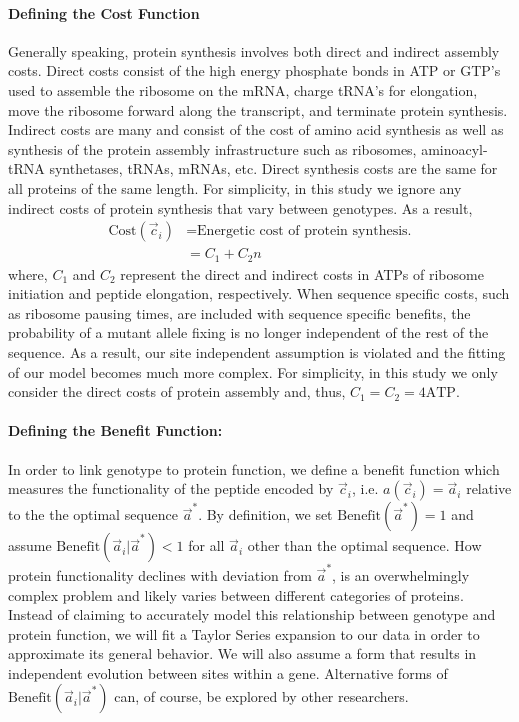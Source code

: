 \documentclass{article}
\newcommand{\cvec}{\ensuremath{\Vec{c}}\xspace}
\newcommand{\cveci}{\ensuremath{\cvec_i}\xspace}
\newcommand{\aveci}{\ensuremath{\Vec{a}_i}\xspace}
\newcommand{\aoptvec}{\ensuremath{\Vec{a}^*}\xspace}
\newcommand{\Costcveci}{\ensuremath{\text{Cost}(\cveci)}\xspace}
\newcommand{\Func}{\ensuremath{\text{Benefit}}\xspace}
\newcommand{\Funcaveci}{\ensuremath{\Func(\aveci|\aoptvec)}\xspace}
\newcommand{\Funcaoptvec}{\ensuremath{\Func(\aoptvec)}\xspace}
\begin{document}
\paragraph*{Defining the Cost Function}
Generally speaking, protein synthesis involves both direct and indirect assembly costs.
Direct costs consist of the high energy phosphate bonds in ATP or GTP's used to assemble the ribosome on the mRNA, charge tRNA's for elongation, move the ribosome forward along the transcript, and terminate protein synthesis.
Indirect costs are many and consist of the cost of amino acid synthesis as well as synthesis of the protein assembly infrastructure such as ribosomes, aminoacyl-tRNA synthetases, tRNAs, mRNAs, etc.
Direct synthesis costs are the same for all proteins of the same length.
For simplicity, in this study we ignore any indirect costs of protein synthesis that vary between genotypes.
As a result, 
\begin{align}
\label{eq:defineCost}
  \Costcveci  &= \text{Energetic cost of protein synthesis.}\\
  &= C_1 + C_2 n
\end{align}
where, $C_1$ and $C_2$ represent the direct and indirect costs in ATPs of ribosome initiation and peptide elongation, respectively.
When sequence specific costs, such as ribosome pausing times, are included with sequence specific benefits, the probability of a mutant allele fixing is no longer independent of the rest of the sequence.
As a result, our site independent assumption is violated and the fitting of our model becomes much more complex.
For simplicity, in this study we only consider the direct costs of protein assembly and, thus, $C_1 = C_2 = 4 \text{ATP}$.
 
\paragraph*{Defining the Benefit Function: }
In order to link genotype to protein function, we define a benefit function which measures the functionality of the peptide encoded by \cveci, i.e. $a(\cveci) = \aveci$ relative to the the optimal sequence $\aoptvec$.
By definition, we set $\Funcaoptvec = 1$ and assume $\Funcaveci < 1$ for all $\aveci$ other than the optimal sequence.
How protein functionality declines with deviation from \aoptvec, is an overwhelmingly complex problem and likely varies between different categories of proteins.
Instead of claiming to accurately model this relationship between genotype and protein function, we will fit a Taylor Series expansion to our data in order to approximate its general behavior.
We will also assume a form that results in independent evolution between sites within a gene.
Alternative forms of \Funcaveci can, of course, be explored by other researchers.
\end{document}
